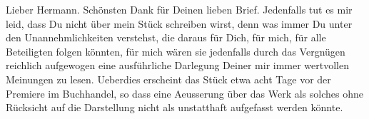\pstart{}Lieber Hermann.\pend\vspace{0.5em}
\pstart
           Schönsten Dank für Deinen lieben Brief. Jedenfalls tut es mir leid, dass Du nicht
               über mein Stück schreiben
               wirst, denn was immer Du unter den Unannehmlichkeiten verstehst, die daraus für Dich,
               für mich, für alle Beteiligten folgen könnten, für mich wären sie jedenfalls durch
               das Vergnügen reichlich aufgewogen eine ausführliche Darlegung Deiner mir immer
               wertvollen Meinungen zu lesen. Ueberdies erscheint das Stück etwa \label{LL120-1v}acht Tage vor der Premiere im Buchhandel\label{LL120-1h}, so dass eine
               Aeusserung über das Werk als solches ohne Rücksicht auf die Darstellung nicht als
               unstatthaft aufgefasst werden könnte.\pend
           
